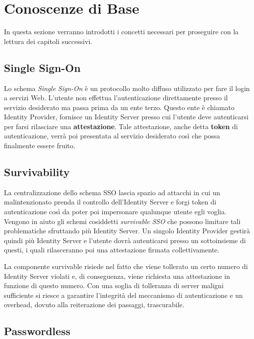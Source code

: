 \chapter{Conoscenze di Base}
\label{conoscenze}

In questa sezione verranno introdotti i concetti necessari per proseguire con la lettura dei capitoli successivi. 

\section{Single Sign-On}
\label{sso}


Lo schema \emph{Single Sign-On} è un protocollo molto diffuso utilizzato per fare il login a servizi Web. L'utente non effettua l'autenticazione direttamente presso il servizio desiderato ma passa prima da un ente terzo. Questo ente è chiamato Identity Provider, fornisce un Identity Server presso cui l'utente deve autenticarsi per farsi rilasciare una \textbf{attestazione}. Tale attestazione, anche detta \textbf{token} di autenticazione, verrà poi presentata al servizio desiderato così che possa finalmente essere fruito. 

\section{Survivability}
\label{surviv}

La centralizzazione dello schema SSO lascia spazio ad attacchi in cui un malintenzionato prenda il controllo dell'Identity Server e forgi token di autenticazione così da poter poi impersonare qualunque utente egli voglia. Vengono in aiuto gli schemi cosiddetti \emph{survivable SSO} che possono limitare tali problematiche sfruttando più Identity Server. Un singolo Identity Provider gestirà quindi più Identity Server e l'utente dovrà autenticarsi presso un sottoinsieme di questi, i quali rilasceranno poi una attestazione firmata collettivamente. 

La componente survivable risiede nel fatto che viene tollerato un certo numero di Identity Server violati e, di conseguenza, viene richiesta una attestazione in funzione di questo numero. Con una soglia di tolleranza di server maligni sufficiente si riesce a garantire l'integrità del meccanismo di autenticazione e un overhead, dovuto alla reiterazione dei passaggi, trascurabile.

\section{Passwordless}
\label{passwordless}

